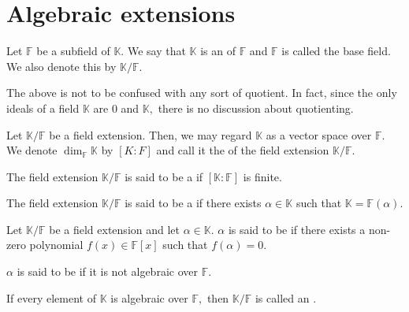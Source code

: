 \chapter{Algebraic extensions}

\begin{defn}%
    Let $\mathbb{F}$ be a subfield of $\mathbb{K}.$ We say that $\mathbb{K}$ is an  of $\mathbb{F}$ and $\mathbb{F}$ is called the base field. We also denote this by $\mathbb{K}/\mathbb{F}.$
\end{defn}

\begin{rem}
    The above is not to be confused with any sort of quotient. In fact, since the only ideals of a field $\mathbb{K}$ are $0$ and $\mathbb{K},$ there is no discussion about quotienting.
\end{rem}

\begin{defn}%
    Let $\mathbb{K}/\mathbb{F}$ be a field extension. Then, we may regard $\mathbb{K}$ as a vector space over $\mathbb{F}.$ We denote $\dim_{\mathbb{F}}\mathbb{K}$ by $[K : F]$ and call it the  of the field extension $\mathbb{K}/\mathbb{F}.$
\end{defn}

\begin{defn}%
    The field extension $\mathbb{K}/\mathbb{F}$ is said to be a  if $[\mathbb{K} : \mathbb{F}]$ is finite. 
\end{defn}

\begin{defn}%
    The field extension $\mathbb{K}/\mathbb{F}$ is said to be a  if there exists $\alpha \in \mathbb{K}$ such that $\mathbb{K} = \mathbb{F}(\alpha).$
\end{defn}

\begin{defn}
    Let $\mathbb{K}/\mathbb{F}$ be a field extension and let $\alpha \in \mathbb{K}.$ $\alpha$ is said to be  if there exists a non-zero polynomial $f(x) \in \mathbb{F}[x]$ such that $f(\alpha) = 0.$

    $\alpha$ is said to be  if it is not algebraic over $\mathbb{F}.$

    If every element of $\mathbb{K}$ is algebraic over $\mathbb{F},$ then $\mathbb{K}/\mathbb{F}$ is called an .
\end{defn}

